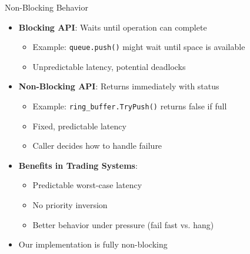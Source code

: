 \documentclass{beamer}
\begin{document}
\begin{frame}{Non-Blocking Behavior}
\begin{itemize}
    \item \textbf{Blocking API}: Waits until operation can complete
    \begin{itemize}
        \item Example: \texttt{queue.push()} might wait until space is available
        \item Unpredictable latency, potential deadlocks
    \end{itemize}
    \item \textbf{Non-Blocking API}: Returns immediately with status
    \begin{itemize}
        \item Example: \texttt{ring\_buffer.TryPush()} returns false if full
        \item Fixed, predictable latency
        \item Caller decides how to handle failure
    \end{itemize}
    \item \textbf{Benefits in Trading Systems}:
    \begin{itemize}
        \item Predictable worst-case latency
        \item No priority inversion
        \item Better behavior under pressure (fail fast vs. hang)
    \end{itemize}
    \item Our implementation is fully non-blocking
\end{itemize}
\end{frame}
\end{document}
